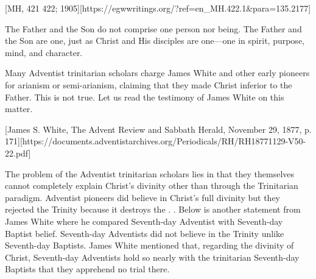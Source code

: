 [MH, 421 422; 1905][https://egwwritings.org/?ref=en\_MH.422.1&para=135.2177]

The Father and the Son do not comprise one person nor being. The Father and the Son are one, just as Christ and His disciples are one—one in spirit, purpose, mind, and character.

Many Adventist trinitarian scholars charge James White and other early pioneers for arianism or semi-arianism, claiming that they made Christ inferior to the Father. This is not true. Let us read the testimony of James White on this matter. 


[James S. White, The Advent Review and Sabbath Herald, November 29, 1877, p. 171][https://documents.adventistarchives.org/Periodicals/RH/RH18771129-V50-22.pdf]

The problem of the Adventist trinitarian scholars lies in that they themselves cannot completely explain Christ’s divinity other than through the Trinitarian paradigm. Adventist pioneers did believe in Christ’s full divinity but they rejected the Trinity because it destroys the . . Below is another statement from James White where he compared Seventh-day Adventist with Seventh-day Baptist belief. Seventh-day Adventists did not believe in the Trinity unlike Seventh-day Baptists. James White mentioned that, regarding the divinity of Christ, Seventh-day Adventists hold so nearly with the trinitarian Seventh-day Baptists that they apprehend no trial there.

